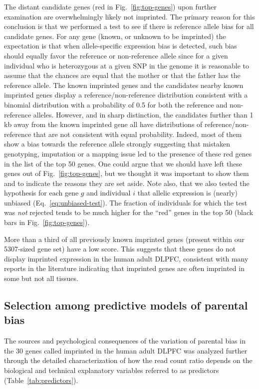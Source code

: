 \documentclass[letterpaper]{article}
\begin{document}
The distant candidate genes (red in Fig.~\ref{fig:top-genes}) upon further
examination are overwhelmingly likely not imprinted. The primary reason for
this conclusion is that we performed a test to see if there is reference
allele bias for all candidate genes. For any gene (known, or unknown to be
imprinted) the expectation is that when allele-specific expression bias is
detected, such bias should equally favor the reference or non-reference allele
since for a given individual who is heterozygous at a given SNP in the genome
it is reasonable to assume that the chances are equal that the mother or that
the father has the reference allele. The known imprinted genes and the
candidates nearby known imprinted genes display a reference/non-reference
distribution consistent with a binomial distribution with a probability of 0.5
for both the reference and non-reference alleles.  However, and in sharp
distinction, the candidates further than 1 kb away from the known imprinted
gene all have distributions of reference/non-reference that are not consistent
with equal probability.  Indeed, most of them show a bias towards the
reference allele strongly suggesting that mistaken genotyping, imputation or a
mapping issue led to the presence of these red genes in the list of the top 50
genes. One could argue that we should have left these genes out of
Fig.~\ref{fig:top-genes}, but we thought it was important to show them and to
indicate the reasons they are set aside.   Note also, that we also tested the
hypothesis for each gene \(g\) and individual \(i\) that allelic expression is
(nearly) unbiased (Eq.~\ref{eq:unbiased-test}).  The fraction of individuals
for which the test was \emph{not} rejected tends to be much higher for the
``red'' genes in the top 50 (black bars in Fig.~\ref{fig:top-genes}).

More than a third of all previously known imprinted genes (present within our
5307-sized gene set) have a low score.  This suggests that these genes do not
display imprinted expression in the human adult DLPFC, consistent with many
reports in the literature indicating that imprinted genes are often imprinted
in some but not all tissues.

\subsection{Selection among predictive models of parental bias}
\label{sec:results-regression}

The sources and psychological consequences of the variation of parental bias
in the 30 genes called imprinted in the human adult DLPFC was analyzed further through the detailed
characterization of how the read count ratio depends on the biological and
technical explanatory variables referred to as predictors
(Table~\ref{tab:predictors}).
\end{document}
